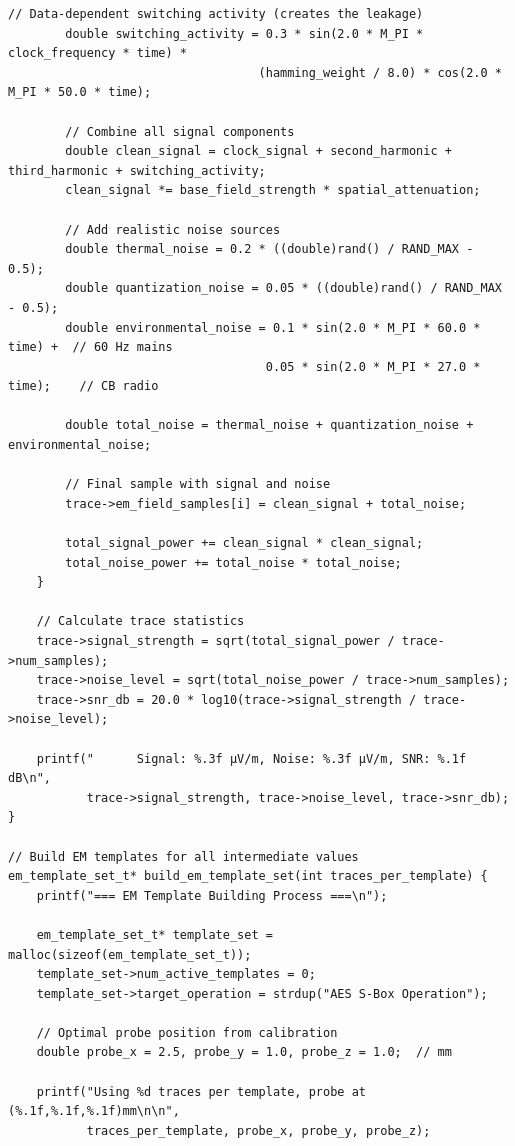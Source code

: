 \documentclass[11pt,a4paper]{article}
\theoremstyle{definition}
\begin{document}
\begin{lstlisting}[caption={Complete EM Template Building Implementation}]
        // Data-dependent switching activity (creates the leakage)
        double switching_activity = 0.3 * sin(2.0 * M_PI * clock_frequency * time) * 
                                   (hamming_weight / 8.0) * cos(2.0 * M_PI * 50.0 * time);
        
        // Combine all signal components
        double clean_signal = clock_signal + second_harmonic + third_harmonic + switching_activity;
        clean_signal *= base_field_strength * spatial_attenuation;
        
        // Add realistic noise sources
        double thermal_noise = 0.2 * ((double)rand() / RAND_MAX - 0.5);
        double quantization_noise = 0.05 * ((double)rand() / RAND_MAX - 0.5);
        double environmental_noise = 0.1 * sin(2.0 * M_PI * 60.0 * time) +  // 60 Hz mains
                                    0.05 * sin(2.0 * M_PI * 27.0 * time);    // CB radio
        
        double total_noise = thermal_noise + quantization_noise + environmental_noise;
        
        // Final sample with signal and noise
        trace->em_field_samples[i] = clean_signal + total_noise;
        
        total_signal_power += clean_signal * clean_signal;
        total_noise_power += total_noise * total_noise;
    }
    
    // Calculate trace statistics
    trace->signal_strength = sqrt(total_signal_power / trace->num_samples);
    trace->noise_level = sqrt(total_noise_power / trace->num_samples);
    trace->snr_db = 20.0 * log10(trace->signal_strength / trace->noise_level);
    
    printf("      Signal: %.3f μV/m, Noise: %.3f μV/m, SNR: %.1f dB\n",
           trace->signal_strength, trace->noise_level, trace->snr_db);
}

// Build EM templates for all intermediate values
em_template_set_t* build_em_template_set(int traces_per_template) {
    printf("=== EM Template Building Process ===\n");
    
    em_template_set_t* template_set = malloc(sizeof(em_template_set_t));
    template_set->num_active_templates = 0;
    template_set->target_operation = strdup("AES S-Box Operation");
    
    // Optimal probe position from calibration
    double probe_x = 2.5, probe_y = 1.0, probe_z = 1.0;  // mm
    
    printf("Using %d traces per template, probe at (%.1f,%.1f,%.1f)mm\n\n",
           traces_per_template, probe_x, probe_y, probe_z);
    

\end{lstlisting}
\end{document}
